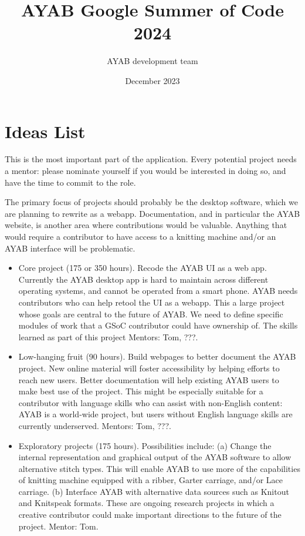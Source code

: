 \documentclass{article}
\title{AYAB Google Summer of Code 2024}
\author{AYAB development team}
\date{December 2023}
\begin{document}
\maketitle

\section{Ideas List}

This is the most important part of the application. Every potential project needs a mentor: please nominate yourself if you would be interested in doing so, and have the time to commit to the role.

The primary focus of projects should probably be the desktop software, which we are planning to rewrite as a webapp. Documentation, and in particular the AYAB website, is another area where contributions would be valuable. Anything that would require a contributor to have access to a knitting machine and/or an AYAB interface will be problematic.

\begin{itemize}
\item Core project (175 or 350 hours). Recode the AYAB UI as a web app. Currently the AYAB desktop app is hard to maintain across different operating systems, and cannot be operated from a smart phone. AYAB needs contributors who can help retool the UI as a webapp. This a large project whose goals are central to the future of AYAB. We need to define specific modules of work that a GSoC contributor could have ownership of. The skills learned as part of this project Mentors: Tom, ???.
\item Low-hanging fruit (90 hours). Build webpages to better document the AYAB project. New online material will foster accessibility by helping efforts to reach new users. Better documentation will help existing AYAB users to make best use of the project. This might be especially suitable for a contributor with language skills who can assist with non-English content: AYAB is a world-wide project, but users without English language skills are currently underserved. Mentors: Tom, ???.
\item Exploratory projects (175 hours). Possibilities include: (a) Change the internal representation and graphical output of the AYAB software to allow alternative stitch types. This will enable AYAB to use more of the capabilities of knitting machine equipped with a ribber, Garter carriage, and/or Lace carriage. (b) Interface AYAB with alternative data sources such as Knitout and Knitspeak formats. These are ongoing research projects in which a creative contributor could make important directions to the future of the project. Mentor: Tom.
\end{itemize}
\end{document}

